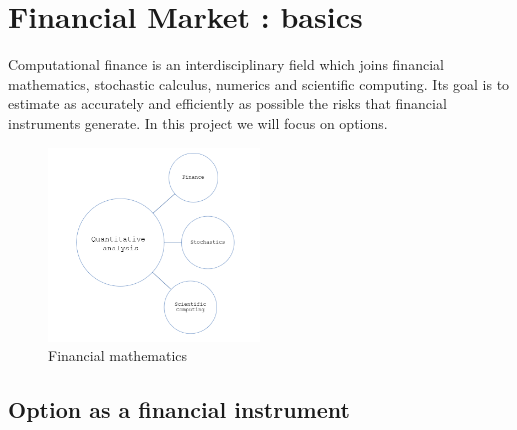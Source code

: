 \documentclass[a4paper]{report}
\begin{document}
  

\chapter{Financial Market : basics}





Computational finance is an interdisciplinary field which joins financial mathematics, stochastic calculus, numerics and scientific computing. Its goal is to estimate as accurately and efficiently as possible the risks that financial instruments generate. In this project we will focus on options.
\begin{figure}[H]
    \centering
    \includegraphics[width=0.5\textwidth]{dia.png}
    \caption{Financial mathematics}
\end{figure}


\section{Option as a financial instrument}
\end{document}
